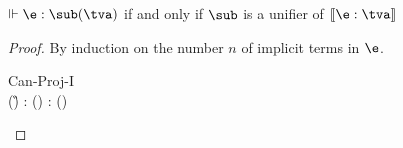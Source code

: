 \documentclass[acmsmall,screen,nonacm,review]{acmart}
\begin{document}
\newcommand{\ThTypPf}[4]{\Pf{#1}{\Th}{#2 : #3}{#4}}
\newcommand{\thTypPf}[4]{\Pf{#1}{\th}{#2 : #3}{#4}}
\newcommand{\UnifierPf}[3]{\Pf{#1}{\text{unifies}}{#2}{#3}}
\newcommand{\eshapePf}[4]{\Pf{}{}{\eshape {#1} {#2} {#3}}{#4}}
\begin{theorem}
  $\Th \e : \sub(\tv)$ if and only if $\sub$ is a unifier of $\csem {\e : \tv}$
  \begin{proof}
    By induction on the number $n$ of implicit terms in $\e$.
    \begin{proofcases}

	\begin{llproof}
\Hand	  {}
	\end{llproof}


	\begin{proofcases}
	  \proofcase{$\implies$}

	  \begin{proofcases}

	    \proofcasederivation
	      {Can-Proj-I}
	      {\eshape \E \e {\any \tvcs \Pi\iton \tvcs} \\ \sub(\G) \Th \E{} : \sub(\tv)}
	      {\Th \E{} : \sub(\tv)}


\end{proofcases}
\end{proofcases}
\end{proofcases}
\end{proof}
\end{theorem}
\end{document}

